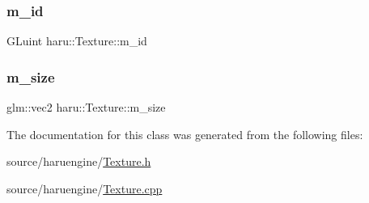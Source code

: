 \subsubsection{\texorpdfstring{m\+\_\+id}{m\_id}}
{\footnotesize\ttfamily G\+Luint haru\+::\+Texture\+::m\+\_\+id\hspace{0.3cm}{\ttfamily [private]}}

\mbox{\label{classharu_1_1_texture_a8a15e433e4eef90ef52bb2243b91ef00}} 
\subsubsection{\texorpdfstring{m\+\_\+size}{m\_size}}
{\footnotesize\ttfamily glm\+::vec2 haru\+::\+Texture\+::m\+\_\+size\hspace{0.3cm}{\ttfamily [private]}}



The documentation for this class was generated from the following files\+:\begin{DoxyCompactItemize}
\item 
source/haruengine/\mbox{\hyperlink{_texture_8h}{Texture.\+h}}\item 
source/haruengine/\mbox{\hyperlink{_texture_8cpp}{Texture.\+cpp}}\end{DoxyCompactItemize}
